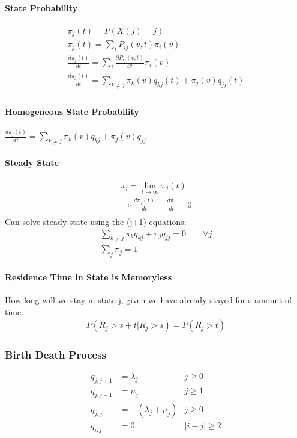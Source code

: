 \paragraph{State Probability}
\begin{align*}
	\pi_j(t) = P(X(j) = j) \\
	\pi_j(t) = \sum_i P_{ij}(v,t) \pi_i(v) \\
	\frac{d \pi_j(t)}{dt} = \sum_i \frac{ \partial P_{ij}(v,t)}{\partial t} \pi_i(v) \\
	\frac{d \pi_j(t)}{dt} = \sum_{k\ne j} \pi_k(v) q_{kj}(t) + \pi_j(v) q_{jj}(t)  \\
\end{align*}

\paragraph{Homogeneous State Probability}
$\frac{d \pi_j(t)}{dt} = \sum_{k\ne j} \pi_k(v) q_{kj} + \pi_j(v) q_{jj}$

\paragraph{Steady State}
\begin{align*}
	\pi_j = \lim_{t \to \infty} \pi_j(t) \\
	\Rightarrow \frac{ d \pi_j(t)}{dt} =  \frac{ d \pi_j }{dt} = 0 \\
\end{align*}
Can solve steady state using the (j+1) equations:
\begin{align*}
	\sum_{k \ne j } \pi_k q_{kj} + \pi_j q_{jj} = 0 \qquad \forall j \\
	\sum_j \pi_j = 1
\end{align*}

\paragraph{Residence Time in State is Memoryless} How long will we stay in state
j, given we have already stayed for s amount of time.
\begin{align*}
	P( R_j > s + t | R_j > s) = P(R_j > t)
\end{align*}


\subsubsection{Birth Death Process}
\begin{align*}
	q_{j,j+1} &= \lambda_j & j \ge 0 \\
	q_{j,j-1} &= \mu_j & j \ge 1 \\
	q_{j,j}   &= -(\lambda_j + \mu_j) & j \ge 0 \\
	q_{i,j}   &= 0 &  |i-j| \ge 2
\end{align*}
